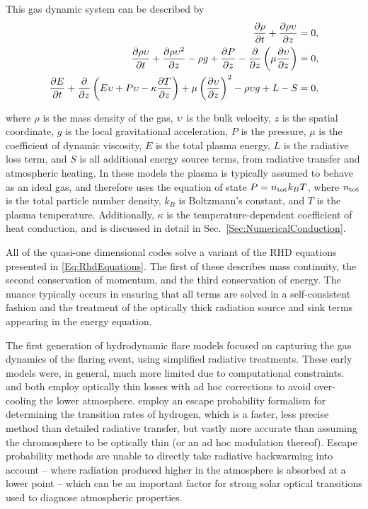This gas dynamic system can be described by
\begin{equation}
    \begin{aligned}
    \frac{\partial \rho}{\partial t} + \frac{\partial \rho \upsilon}{\partial z} &= 0,\\
    \frac{\partial \rho \upsilon}{\partial t} + \frac{\partial \rho \upsilon^2}{\partial z} - \rho g + \frac{\partial P}{\partial z} - \frac{\partial}{\partial z}\left(\mu \frac{\partial \upsilon}{\partial z}\right) &= 0,\\
    \frac{\partial E}{\partial t} + \frac{\partial}{\partial z}\left( E\upsilon + P\upsilon - \kappa\frac{\partial T}{\partial z} \right)+ \mu\left(\frac{\partial \upsilon}{\partial z}\right)^2 -\rho \upsilon g + L - S &= 0,
    \end{aligned}\label{Eq:RhdEquations}
\end{equation}

where $\rho$ is the mass density of the gas, $\upsilon$ is the bulk velocity, $z$ is the spatial coordinate, $g$ is the local gravitational acceleration, $P$ is the pressure, $\mu$ is the coefficient of dynamic viscosity, $E$ is the total plasma energy, $L$ is the radiative loss term, and $S$ is all additional energy source terms, from radiative transfer and atmospheric heating.
In these models the plasma is typically assumed to behave as an ideal gas, and therefore uses the equation of state
$P = n_{\textnormal{tot}} k_B T$, where $n_{\textnormal{tot}}$ is the total particle number density, $k_B$ is Boltzmann's constant, and $T$ is the plasma temperature. Additionally, $\kappa$ is the temperature-dependent coefficient of heat conduction, and is discussed in detail in Sec.~\ref{Sec:NumericalConduction}.

All of the quasi-one dimensional codes solve a variant of the RHD equations presented in \eqref{Eq:RhdEquations}. The first of these describes mass continuity, the second conservation of momentum, and the third conservation of energy.
The nuance typically occurs in ensuring that all terms are solved in a self-consistent fashion and the treatment of the optically thick radiation source and sink terms appearing in the energy equation.

The first generation of hydrodynamic flare models \citet{Nagai1980,Mariska1982,McClymont1983} focused on capturing the gas dynamics of the flaring event, using simplified radiative treatments.
These early models were, in general, much more limited due to computational constraints. \citet{Nagai1980} and \citet{Mariska1982} both employ optically thin losses with ad hoc corrections to avoid over-cooling the lower atmosphere.
\citet{McClymont1983} employ an escape probability formalism for determining the transition rates of hydrogen, which is a faster, less precise method than detailed radiative transfer, but vastly more accurate than assuming the chromosphere to be optically thin (or an ad hoc modulation thereof).
Escape probability methods are unable to directly take radiative backwarming into account -- where radiation produced higher in the atmosphere is absorbed at a lower point -- which can be an important factor for strong solar optical transitions used to diagnose atmospheric properties.

